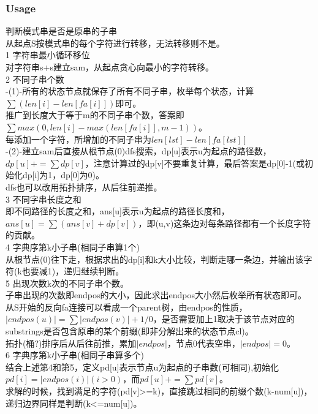 \documentclass[a4paper,12pt]{article}
\begin{document}
\subsubsection{Usage}
\begin{framed}
	 判断模式串是否是原串的子串
	\\ 从起点S按模式串的每个字符进行转移，无法转移则不是。
	\\ 1 字符串最小循环移位
	\\ 对字符串s+s建立sam，从起点贪心向最小的字符转移。
	\\ 2 不同子串个数
	\\ -(1)-所有的状态节点就保存了所有不同子串，枚举每个状态，计算$\sum (len[i]-len[fa[i]])$即可。
	\\ 推广到长度大于等于m的不同子串个数，答案即$\sum max(0,len[i]-max(len[fa[i]],m-1))$。
	\\ 每添加一个字符，所增加的不同子串为$len[lst]-len[fa[lst]]$ 
	\\
	 -(2)-建立sam后直接从根节点(0)dfs搜索，dp[u]表示u为起点的路径数，$dp[u]+=\sum dp[v]$，注意计算过的dp[v]不要重复计算，最后答案是dp[0]-1(或初始化dp[i]为1，dp[0]为0)。
	\\dfs也可以改用拓扑排序，从后往前递推。
	\\ 3 不同字串长度之和
	\\ 即不同路径的长度之和，ans[u]表示u为起点的路径长度和，$ans[u]=\sum (ans[v]+dp[v])$，即(u,v)这条边对每条路径都有一个长度字符的贡献。
	\\ 4 字典序第k小子串(相同子串算1个)
	\\ 从根节点(0)往下走，根据求出的dp[i]和k大小比较，判断走哪一条边，并输出该字符(k也要减1)，递归继续判断。
	\\ 5 出现次数k次的不同子串个数。
	\\ 子串出现的次数即endpos的大小，因此求出endpos大小然后枚举所有状态即可。
	\\ 从S开始的反向fa连接可以看成一个parent树，由endpos的性质，$|endpos(u)|=\sum |endpos(v)|+1/0$，是否需要加上1取决于该节点对应的substrings是否包含原串的某个前缀(即非分解出来的状态节点cl)。
	\\ 拓扑(桶?)排序后从后往前推，累加$|endpos|$，节点0代表空串，$|endpos|=0$。
	\\ 6 字典序第k小子串(相同子串算多个)
	\\ 结合上述第4和第5，定义pd[u]表示节点u为起点的子串数(可相同),初始化$pd[i]=|endpos(i)|(i>0)$，而$pd[u]+=\sum pd[v]$。
	\\ 求解的时候，找到满足的字符(pd[v]>=k)，直接跳过相同的前缀个数(k-num[u])，递归边界同样是判断(k<=num[u])。
\end{framed}
\end{document}
